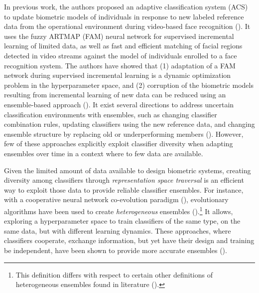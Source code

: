 In previous work, the authors proposed an adaptive classification system (ACS) to update biometric models of individuals in response to new labeled reference data from the operational environment during video-based face recognition (\cite{connolly10}).
It uses the fuzzy ARTMAP (FAM) neural network for supervised incremental learning of limited data, as well as fast and efficient matching of facial regions detected in video streams against the model of individuals enrolled to a face recognition system.
The authors have showed that (1) adaptation of a FAM network during supervised incremental learning is a dynamic optimization problem in the hyperparameter space, and (2) corruption of the biometric models resulting from incremental learning of new data can be reduced using an ensemble-based approach (\cite{connolly10_2}).
It exist several directions to address uncertain classification environments with ensembles, such as changing classifier combination rules, updating classifiers using the new reference data, and changing ensemble structure by replacing old or underperforming members (\cite{kuncheva04}).
However, few of these approaches explicitly exploit classifier diversity when adapting ensembles over time in a context where to few data are available.

Given the limited amount of data available to design biometric systems, creating diversity among classifiers through \emph{representation space traversal} is an efficient way to exploit those data to provide reliable classifier ensembles.
For instance, with a cooperative neural network co-evolution paradigm (\cite{potter00}), evolutionary algorithms have been used to create \emph{heterogeneous} ensembles (\cite{valentini03}).\footnote{This definition differs with respect to certain other definitions of heterogeneous ensembles found in literature (\cite{oliveira09, rashid09}).}
It allows, exploring a hyperparameter space to train classifiers of the same type, on the same data, but with different learning dynamics.
These approaches, where classifiers cooperate, exchange information, but yet have their design and training be independent, have been shown to provide more accurate ensembles (\cite{bakker03, garcia05, liu01, zhou02}).

